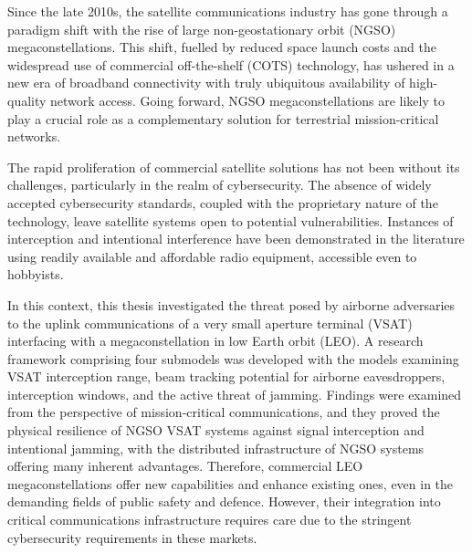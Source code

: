 \documentclass[english, 12pt, a4paper, elec, utf8, a-1b, online]{aaltothesis}
\date{29.12.2023}
\begin{document}
\makecoverpage

\makecopyrightpage


\begin{abstractpage}[english]
  Since the late 2010s, the satellite communications industry has gone through a paradigm shift with the rise of large non-geostationary orbit (NGSO) megaconstellations.
  This shift, fuelled by reduced space launch costs and the widespread use of commercial off-the-shelf (COTS) technology, has ushered in a new era of broadband connectivity with truly ubiquitous availability of high-quality network access.
  Going forward, NGSO megaconstellations are likely to play a crucial role as a complementary solution for terrestrial mission-critical networks.

  The rapid proliferation of commercial satellite solutions has not been without its challenges, particularly in the realm of cybersecurity. The absence of widely accepted cybersecurity standards, coupled with the proprietary nature of the technology, leave satellite systems open to potential vulnerabilities. Instances of interception and intentional interference have been demonstrated in the literature using readily available and affordable radio equipment, accessible even to hobbyists.

  In this context, this thesis investigated the threat posed by airborne adversaries to the uplink communications of a very small aperture terminal (VSAT) interfacing with a megaconstellation in low Earth orbit (LEO). A research framework comprising four submodels was developed with the models examining VSAT interception range, beam tracking potential for airborne eavesdroppers, interception windows, and the active threat of jamming. Findings were examined from the perspective of mission-critical communications, and they proved the physical resilience of NGSO VSAT systems against signal interception and intentional jamming, with the distributed infrastructure of NGSO systems offering many inherent advantages. Therefore, commercial LEO megaconstellations offer new capabilities and enhance existing ones, even in the demanding fields of public safety and defence. However, their integration into critical communications infrastructure requires care due to the stringent cybersecurity requirements in these markets.
\end{abstractpage}
\end{document}
